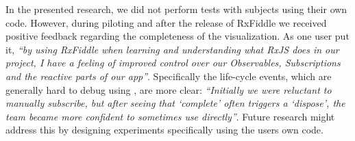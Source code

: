 In the presented research, we did not perform tests with subjects using their own code. However, during piloting and after the release of RxFiddle we received positive feedback regarding the completeness of the visualization. As one user put it, \emph{``by using RxFiddle when learning and understanding what RxJS does in our project, I have a feeling of improved control over our Observables, Subscriptions and the reactive parts of our app''}. Specifically the life-cycle events, which are generally hard to debug using \printfdebugging{}, are more clear: \emph{``Initially we were reluctant to manually subscribe, but after seeing that `complete' often triggers a `dispose', the team became more confident to sometimes use  directly''}.
Future research might address this by designing experiments specifically using the users own code.



